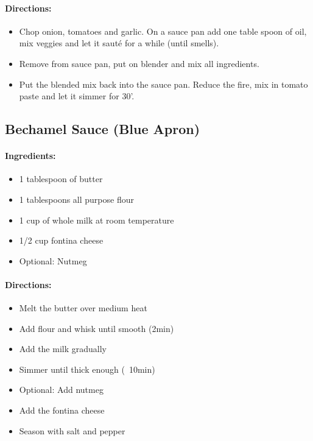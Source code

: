 \documentclass{article}
\begin{document}
\paragraph{Directions:}
\begin{itemize}
	\item Chop onion, tomatoes and garlic. On a sauce pan add one table spoon of oil, mix veggies and let it sauté for a while (until smells). 
	\item Remove from sauce pan, put on blender and mix all ingredients. 
	\item Put the blended mix back into the sauce pan. Reduce the fire, mix in tomato paste and let it simmer for 30'.
\end{itemize}

\subsection{Bechamel Sauce (Blue Apron)}

\paragraph{Ingredients:}

\begin{itemize}
\item 1 tablespoon of butter
\item 1 tablespoons all purpose flour
\item 1 cup of whole milk at room temperature
\item 1/2 cup fontina cheese
\item Optional: Nutmeg
\end{itemize}

\paragraph{Directions:}
\begin{itemize}
\item Melt the butter over medium heat
\item Add flour and whisk until smooth (2min)
\item Add the milk gradually
\item Simmer until thick enough (~10min)
\item Optional: Add nutmeg
\item Add the fontina cheese
\item Season with salt and pepper
\end{itemize}
\end{document}
